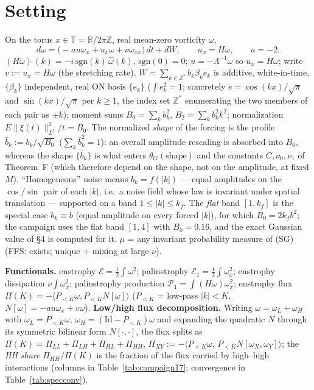 \documentclass[11pt]{article}
\theoremstyle{remark}
\theoremstyle{plain}
\newcommand{\eqdef}{:=}
\begin{document}
\section{Setting}

On the torus $x \in \mathbb{T} = \mathbb{R}/2\pi\mathbb{Z}$, real mean-zero vorticity $\omega$,
\begin{equation}
   d\omega = \bigl( -a u \omega_x + u_x \omega + \nu \omega_{xx} \bigr)\, dt + dW,\qquad u_x = H\omega,\qquad a = -2. \tag{SG}
\end{equation}
$(H\omega)\hat{}\,(k) = -i\,\mathrm{sgn}(k)\,\hat\omega(k)$, $\mathrm{sgn}(0)=0$; $u = -\Lambda^{-1}\omega$ so $u_x = H\omega$; write
$v \eqdef u_x = H\omega$ (the stretching rate). $W = \sum_{k\in\mathbb{Z}^*} b_k \beta_k e_k$ is additive,
white-in-time, $\{\beta_k\}$ independent, real ON basis $\{e_k\}$ ($\int e_k^2=1$;
concretely $e = \cos(kx)/\sqrt{\pi}$ and $\sin(kx)/\sqrt{\pi}$ per $k \ge 1$, the
index set $\mathbb{Z}^*$ enumerating the two members of each pair as $\pm k$); moment sums
$B_0 = \sum_k b_k^2$, $B_2 = \sum_k b_k^2 k^2$; normalization $E\|\xi(t)\|^2_{L^2}/t = B_0$. The
normalized \emph{shape} of the forcing is the profile $\bar b_k \eqdef b_k/\sqrt{B_0}$
($\sum_k \bar b_k^2 = 1$): an overall amplitude rescaling is absorbed into $B_0$, whereas the
shape $\{\bar b_k\}$ is what enters $\theta_G(\text{shape})$ and the constants $C, \nu_0, \nu_1$ of
Theorem~F (which therefore depend on the shape, not on the amplitude, at fixed $M$). ``Homogeneous''
noise means $b_k = f(|k|)$ --- equal amplitudes on the $\cos/\sin$ pair of each $|k|$,
i.e.\ a noise field whose law is invariant under spatial translation --- supported
on a band $1 \le |k| \le k_f$. The \emph{flat} band $[1,k_f]$ is the special case
$b_k \equiv b$ (equal amplitude on every forced $|k|$), for which $B_0 = 2 k_f b^2$; the
campaign uses the flat band $[1,4]$ with $B_0 = 0.16$, and the exact Gaussian value of
\S4 is computed for it. $\mu$ = any invariant
probability measure of (SG) (FFS: exists; unique + mixing at large $\nu$).

\textbf{Functionals.} enstrophy $\mathcal{E} = \tfrac12\int\omega^2$; palinstrophy $\mathcal{E}_1 = \tfrac12\int\omega_x^2$; enstrophy
dissipation $\nu\int\omega_x^2$; palinstrophy production $\mathcal{P}_1 = \int (H\omega)\omega_x^2$; enstrophy flux
$\Pi(K) = -\langle P_{<K}\omega, P_{<K}N[\omega]\rangle$ ($P_{<K}$ = low-pass $|k|<K$, $N[\omega] = -au\omega_x+v\omega$).
\textbf{Low/high flux decomposition.} Writing $\omega = \omega_L + \omega_H$ with
$\omega_L = P_{<K}\omega$, $\omega_H = (\mathrm{Id}-P_{<K})\omega$ and expanding the quadratic
$N$ through its symmetric bilinear form $N[\cdot,\cdot]$, the flux splits as
$\Pi(K) = \Pi_{LL} + \Pi_{LH} + \Pi_{HL} + \Pi_{HH}$, $\Pi_{XY} \eqdef -\langle P_{<K}\omega,\,P_{<K}N[\omega_X,\omega_Y]\rangle$;
the \emph{HH share} $\Pi_{HH}/\Pi(K)$ is the fraction of the flux carried by high--high
interactions (columns in Table~\ref{tab:campaign17}; convergence in Table~\ref{tab:specconv}).
\end{document}

